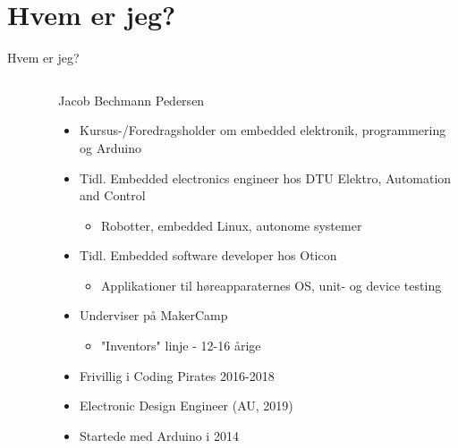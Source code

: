 \documentclass[aspectratio=169]{beamer}
\begin{document}
\section{Hvem er jeg?}
\begin{frame}[fragile]{Hvem er jeg?}
\begin{columns}
	\begin{column}{0.4\textwidth}
		\begin{center}
		\vspace{0.05\textwidth}
		\begin{columns}
			\begin{column}{0.33\textwidth}
			\end{column}
			\begin{column}{0.33\textwidth}
			\end{column}
			\begin{column}{0.33\textwidth}
			\end{column}
		\end{columns}
		\end{center}
	\end{column}	

	\begin{column}{0.6\textwidth}
	\begin{textBox}
		Jacob Bechmann Pedersen
			\begin{itemize}
				\item Kursus-/Foredragsholder om embedded elektronik, programmering og Arduino
				\item Tidl. Embedded electronics engineer hos DTU Elektro, Automation and Control
					\begin{itemize}
						\item Robotter, embedded Linux, autonome systemer
					\end{itemize}
				\item Tidl. Embedded software developer hos Oticon
					\begin{itemize}
						\item Applikationer til høreapparaternes OS, unit- og device testing
					\end{itemize}
				\item Underviser på MakerCamp
					\begin{itemize}
						\item "Inventors" linje - 12-16 årige
					\end{itemize}
				\item Frivillig i Coding Pirates 2016-2018
				\item Electronic Design Engineer (AU, 2019)
				\item Startede med Arduino i 2014
			\end{itemize}
	\end{textBox}
	\end{column}
\end{columns}	
\end{frame}
\end{document}
